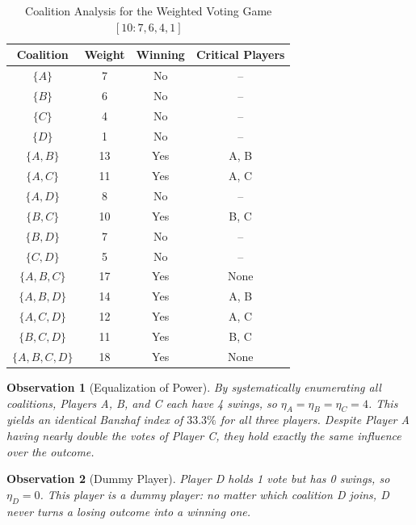 \documentclass[lettersize,journal]{IEEEtran}
\newtheorem{observation}{Observation}
\begin{document}
\begin{table}[!t]
\caption{Coalition Analysis for the Weighted Voting Game $[10:7,6,4,1]$}
\label{tab:coalition_analysis}
\centering
\begin{tabular}{c c c c}
\toprule
\textbf{Coalition} & \textbf{Weight} & \textbf{Winning} & \textbf{Critical Players} \\
\midrule
$\{A\}$ & 7 & No & -- \\
$\{B\}$ & 6 & No & -- \\
$\{C\}$ & 4 & No & -- \\
$\{D\}$ & 1 & No & -- \\
$\{A,B\}$ & 13 & Yes & A, B \\
$\{A,C\}$ & 11 & Yes & A, C \\
$\{A,D\}$ & 8 & No & -- \\
$\{B,C\}$ & 10 & Yes & B, C \\
$\{B,D\}$ & 7 & No & -- \\
$\{C,D\}$ & 5 & No & -- \\
$\{A,B,C\}$ & 17 & Yes & None \\
$\{A,B,D\}$ & 14 & Yes & A, B \\
$\{A,C,D\}$ & 12 & Yes & A, C \\
$\{B,C,D\}$ & 11 & Yes & B, C \\
$\{A,B,C,D\}$ & 18 & Yes & None \\
\bottomrule
\end{tabular}
\end{table}

\begin{observation}[Equalization of Power]
By systematically enumerating all coalitions, Players A, B, and C each have 4 swings, so $\eta_A=\eta_B=\eta_C=4$. This yields an identical Banzhaf index of $33.3\%$ for all three players. Despite Player A having nearly double the votes of Player C, they hold exactly the same influence over the outcome.
\end{observation}

\begin{observation}[Dummy Player]
Player D holds 1 vote but has 0 swings, so $\eta_D=0$. This player is a dummy player: no matter which coalition D joins, D never turns a losing outcome into a winning one.
\end{observation}
\end{document}
